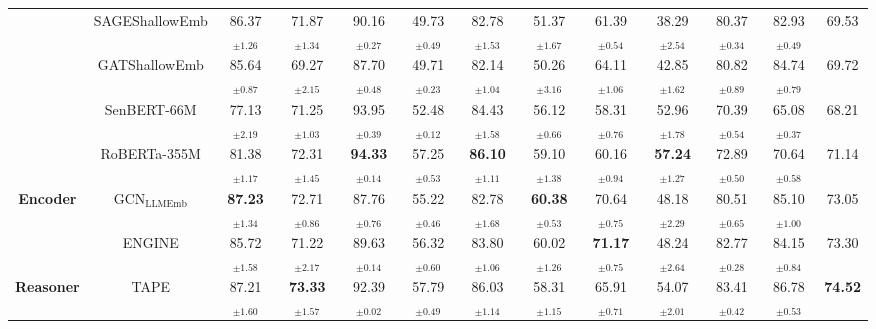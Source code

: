 \begin{table*}[!h]
{\begin{tabular}{cc|ccccccccccc}
      & {SAGE\tiny{ShallowEmb}} & 86.37$_{\pm \text{1.26}}$ & 71.87$_{\pm \text{1.34}}$ & 90.16$_{\pm \text{0.27}}$ & 49.73$_{\pm \text{0.49}}$ & 82.78$_{\pm \text{1.53}}$ & 51.37$_{\pm \text{1.67}}$ & 61.39$_{\pm \text{0.54}}$ & 38.29$_{\pm \text{2.54}}$ & 80.37$_{\pm \text{0.34}}$ & 82.93$_{\pm \text{0.49}}$ & 69.53 \\ 
      & {GAT\tiny{ShallowEmb}} & 85.64$_{\pm \text{0.87}}$ & 69.27$_{\pm \text{2.15}}$ & 87.70$_{\pm \text{0.48}}$ & 49.71$_{\pm \text{0.23}}$ & 82.14$_{\pm \text{1.04}}$ & 50.26$_{\pm \text{3.16}}$ & 64.11$_{\pm \text{1.06}}$ & 42.85$_{\pm \text{1.62}}$ & 80.82$_{\pm \text{0.89}}$ & 84.74$_{\pm \text{0.79}}$ & 69.72 \\ 
      & SenBERT-66M & 77.13$_{\pm \text{2.19}}$ & 71.25$_{\pm \text{1.03}}$ & \cellcolor{orange!10} 93.95$_{\pm \text{0.39}}$ & 52.48$_{\pm \text{0.12}}$ & 84.43$_{\pm \text{1.58}}$ & 56.12$_{\pm \text{0.66}}$ & 58.31$_{\pm \text{0.76}}$ & 52.96$_{\pm \text{1.78}}$ & 70.39$_{\pm \text{0.54}}$ & 65.08$_{\pm \text{0.37}}$ & 68.21 \\
      & {RoBERTa-355M} & 81.38$_{\pm \text{1.17}}$ & 72.31$_{\pm \text{1.45}}$ & \cellcolor{orange!25} \textbf{94.33$_{\pm \text{0.14}}$} & 57.25$_{\pm \text{0.53}}$ & \cellcolor{orange!25} \textbf{86.10$_{\pm \text{1.11}}$} & 59.10$_{\pm \text{1.38}}$ & 60.16$_{\pm \text{0.94}}$ & \cellcolor{orange!25} \textbf{57.24$_{\pm \text{1.27}}$} & 72.89$_{\pm \text{0.50}}$ & 70.64$_{\pm \text{0.58}}$  & 71.14 \\ \midrule
      \multirow{2}{*}{\textbf{Encoder}} & $\text{GCN}_{\text{LLMEmb}}$ & \cellcolor{orange!25} \textbf{87.23$_{\pm \text{1.34}}$} & 
      \cellcolor{orange!10} 72.71$_{\pm \text{0.86}}$ & 87.76$_{\pm \text{0.76}}$ & 55.22$_{\pm \text{0.46}}$ & 82.78$_{\pm \text{1.68}}$ & \cellcolor{orange!25} \textbf{60.38$_{\pm \text{0.53}}$} & \cellcolor{orange!10} 70.64$_{\pm \text{0.75}}$ & 48.18$_{\pm \text{2.29}}$ & 80.51$_{\pm \text{0.65}}$ & 85.10$_{\pm \text{1.00}}$ & 73.05 \\ 
      & ENGINE & 85.72$_{\pm \text{1.58}}$ & 71.22$_{\pm \text{2.17}}$ & 89.63$_{\pm \text{0.14}}$ & 56.32$_{\pm \text{0.60}}$ & 83.80$_{\pm \text{1.06}}$ & \cellcolor{orange!10} 60.02$_{\pm \text{1.26}}$ & \cellcolor{orange!25} \textbf{71.17$_{\pm \text{0.75}}$} & 48.24$_{\pm \text{2.64}}$ & 82.77$_{\pm \text{0.28}}$ & 84.15$_{\pm \text{0.84}}$ & 73.30 \\  \midrule
      \textbf{Reasoner} & TAPE & \cellcolor{orange!10} 87.21$_{\pm \text{1.60}}$ & \cellcolor{orange!25} \textbf{73.33$_{\pm \text{1.57}}$} & 92.39$_{\pm \text{0.02}}$ & \cellcolor{orange!10} 57.79$_{\pm \text{0.49}}$ & \cellcolor{orange!10} 86.03$_{\pm \text{1.14}}$ & 58.31$_{\pm \text{1.15}}$ & 65.91$_{\pm \text{0.71}}$ & 54.07$_{\pm \text{2.01}}$ & \cellcolor{orange!10} 83.41$_{\pm \text{0.42}}$ & \cellcolor{orange!10} 86.78$_{\pm \text{0.53}}$  & \cellcolor{orange!25} \textbf{74.52} \\  \midrule

\end{tabular}}
\end{table*}
